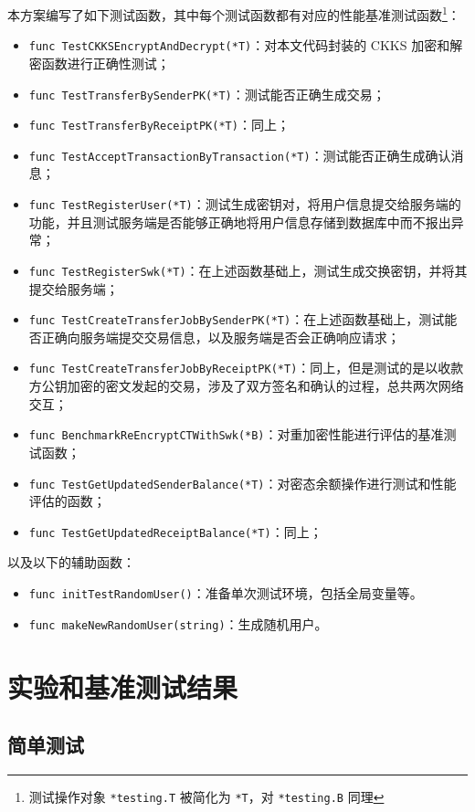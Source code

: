 本方案编写了如下测试函数，其中每个测试函数都有对应的性能基准测试函数\footnote{测试操作对象 \texttt{*testing.T} 被简化为 \texttt{*T}，对 \texttt{*testing.B} 同理}：

\begin{itemize}
    \item \verb|func TestCKKSEncryptAndDecrypt(*T)|：对本文代码封装的 CKKS 加密和解密函数进行正确性测试；
    \item \verb|func TestTransferBySenderPK(*T)|：测试能否正确生成交易；
    \item \verb|func TestTransferByReceiptPK(*T)|：同上；
    \item \verb|func TestAcceptTransactionByTransaction(*T)|：测试能否正确生成确认消息；
    \item \verb|func TestRegisterUser(*T)|：测试生成密钥对，将用户信息提交给服务端的功能，并且测试服务端是否能够正确地将用户信息存储到数据库中而不报出异常；
    \item \verb|func TestRegisterSwk(*T)|：在上述函数基础上，测试生成交换密钥，并将其提交给服务端；
    \item \verb|func TestCreateTransferJobBySenderPK(*T)|：在上述函数基础上，测试能否正确向服务端提交交易信息，以及服务端是否会正确响应请求；
    \item \verb|func TestCreateTransferJobByReceiptPK(*T)|：同上，但是测试的是以收款方公钥加密的密文发起的交易，涉及了双方签名和确认的过程，总共两次网络交互；
    \item \verb|func BenchmarkReEncryptCTWithSwk(*B)|：对重加密性能进行评估的基准测试函数；
    \item \verb|func TestGetUpdatedSenderBalance(*T)|：对密态余额操作进行测试和性能评估的函数；
    \item \verb|func TestGetUpdatedReceiptBalance(*T)|：同上；
\end{itemize}

以及以下的辅助函数：

\begin{itemize}
    \item \verb|func initTestRandomUser()|：准备单次测试环境，包括全局变量等。
    \item \verb|func makeNewRandomUser(string)|：生成随机用户。
\end{itemize}

\section{实验和基准测试结果}

\subsection{简单测试}

